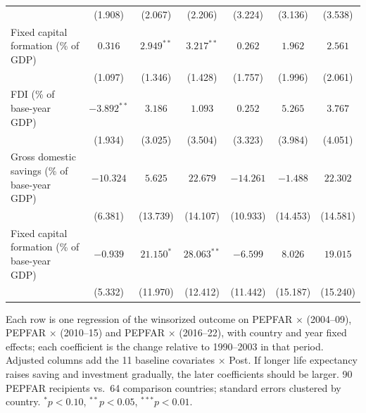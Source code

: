 \begin{table}[htbp]
{\begin{tabular}{lcccccc}
 & (1.908) & (2.067) & (2.206) & (3.224) & (3.136) & (3.538) \\
Fixed capital formation (\% of GDP) & $0.316$ & $2.949^{**}$ & $3.217^{**}$ & $0.262$ & $1.962$ & $2.561$ \\
 & (1.097) & (1.346) & (1.428) & (1.757) & (1.996) & (2.061) \\
FDI (\% of base-year GDP) & $-3.892^{**}$ & $3.186$ & $1.093$ & $0.252$ & $5.265$ & $3.767$ \\
 & (1.934) & (3.025) & (3.504) & (3.323) & (3.984) & (4.051) \\
Gross domestic savings (\% of base-year GDP) & $-10.324$ & $5.625$ & $22.679$ & $-14.261$ & $-1.488$ & $22.302$ \\
 & (6.381) & (13.739) & (14.107) & (10.933) & (14.453) & (14.581) \\
Fixed capital formation (\% of base-year GDP) & $-0.939$ & $21.150^{*}$ & $28.063^{**}$ & $-6.599$ & $8.026$ & $19.015$ \\
 & (5.332) & (11.970) & (12.412) & (11.442) & (15.187) & (15.240) \\
\bottomrule
\end{tabular}}
\par\vspace{4pt}
\begin{minipage}{\textwidth}\footnotesize Each row is one regression of the winsorized outcome on PEPFAR $\times$ (2004--09), PEPFAR $\times$ (2010--15) and PEPFAR $\times$ (2016--22), with country and year fixed effects; each coefficient is the change relative to 1990--2003 in that period. Adjusted columns add the 11 baseline covariates $\times$ Post. If longer life expectancy raises saving and investment gradually, the later coefficients should be larger. 90 PEPFAR recipients vs.\ 64 comparison countries; standard errors clustered by country. $^{*}p<0.10$, $^{**}p<0.05$, $^{***}p<0.01$.\end{minipage}
\end{table}
